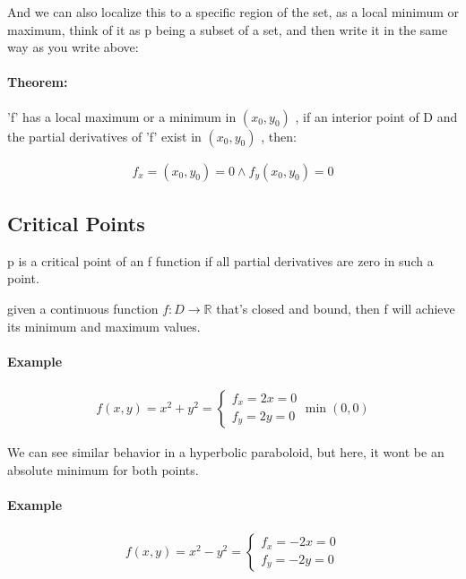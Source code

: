\documentclass[11pt,fleqn]{book} %
\begin{document}
And we can also localize this to a specific region of the set, as a local
minimum or maximum, think of it as p being a subset of a set, and then write it
in the same way as you write above:


\paragraph{Theorem: }

'f' has a local maximum or a minimum in $(x_0, y_0)$ , 
if an interior point of D and the partial derivatives of 'f' exist in
$ (x_0, y_0) $ , then:

\begin{gather}
    f_x = (x_0, y_0) = 0 \wedge f_y(x_0, y_0) = 0
\end{gather}

\subsection{Critical Points}

p is a critical point of an f function if all partial derivatives are zero in such a point. 

given a continuous function $f: D \to \mathbb{R} $
that's closed and bound, then f will achieve its 
minimum and maximum values.

\paragraph{Example}
\begin{gather}
    f(x,y) = x^2 + y^2 = \begin{cases}
        f_x = 2x = 0 \\
        f_y = 2y = 0
    \end{cases} \min(0,0)
\end{gather}

We can see similar behavior in a hyperbolic paraboloid, but here, it wont be an absolute minimum for both points.

\paragraph{Example}
\begin{gather}
    f(x,y) = x^2 - y^2 = \begin{cases}
        f_x = -2x = 0 \\
        f_y = -2y = 0
    \end{cases}
\end{gather}
\end{document}
